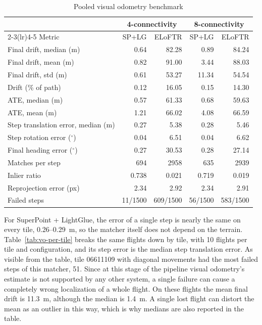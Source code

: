 \documentclass[english, Lau, oneside]{sapthesis}%
\begin{document}
\begin{table}[!htbp]
  \centering
  \caption{Pooled visual odometry benchmark}
  \label{tab:vo-pooled}
  \small
  \begin{tabular}{lrrrr}
    \toprule
     & \multicolumn{2}{c}{4-connectivity} & \multicolumn{2}{c}{8-connectivity} \\
    \cmidrule(lr){2-3}\cmidrule(lr){4-5}
    Metric & SP+LG & ELoFTR & SP+LG & ELoFTR \\
    \midrule
    Final drift, median (m) & 0.64 & 82.28 & 0.89 & 84.24 \\
    Final drift, mean (m) & 0.82 & 91.00 & 3.44 & 88.03 \\
    Final drift, std (m) & 0.61 & 53.27 & 11.34 & 54.54 \\
    Drift (\% of path) & 0.12 & 16.05 & 0.15 & 14.30 \\
    ATE, median (m) & 0.57 & 61.33 & 0.68 & 59.63 \\
    ATE, mean (m) & 1.21 & 66.02 & 4.08 & 66.59 \\
    Step translation error, median (m) & 0.27 & 5.38 & 0.28 & 5.46 \\
    Step rotation error ($^\circ$) & 0.04 & 6.51 & 0.04 & 6.62 \\
    Final heading error ($^\circ$) & 0.27 & 30.53 & 0.28 & 27.14 \\
    Matches per step & 694 & 2958 & 635 & 2939 \\
    Inlier ratio & 0.738 & 0.021 & 0.719 & 0.019 \\
    Reprojection error (px) & 2.34 & 2.92 & 2.34 & 2.91 \\
    Failed steps & 11/1500 & 609/1500 & 56/1500 & 583/1500 \\
    \bottomrule
  \end{tabular}
\end{table}

For SuperPoint + LightGlue, the error of a single step is nearly the same on every tile, 0.26--0.29~m, so the matcher itself does not depend on the terrain. Table~\ref{tab:vo-per-tile} breaks the same flights down by tile, with 10 flights per tile and configuration, and its step error is the median step translation error. As visible from the table, tile 06611109 with diagonal movements had the most failed steps of this matcher, 51. Since at this stage of the pipeline visual odometry's estimate is not supported by any other system, a single failure can cause a completely wrong localization of a whole flight. On these flights the mean final drift is 11.3~m, although the median is 1.4~m. A single lost flight can distort the mean as an outlier in this way, which is why medians are also reported in the table.
\end{document}
